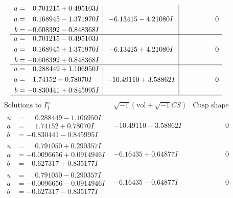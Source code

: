\documentclass[1p]{elsarticle_modified}
\theoremstyle{definition}
\newcommand{\I}{\sqrt{-1}}
\begin{document}
$$\begin{array}{c|c|c}
\begin{aligned}
u &= \phantom{-}0.701215 + 0.495103 I \\
a &= \phantom{-}0.168945 - 1.371970 I \\
b &= -0.608392 - 0.848368 I\end{aligned}
 & -6.13415 - 4.21080 I & \phantom{-0.000000 } 0 \\ \hline\begin{aligned}
u &= \phantom{-}0.701215 - 0.495103 I \\
a &= \phantom{-}0.168945 + 1.371970 I \\
b &= -0.608392 + 0.848368 I\end{aligned}
 & -6.13415 + 4.21080 I & \phantom{-0.000000 } 0 \\ \hline\begin{aligned}
u &= \phantom{-}0.288449 + 1.106950 I \\
a &= \phantom{-}1.74152 - 0.78070 I \\
b &= -0.830441 + 0.845995 I\end{aligned}
 & -10.49110 + 3.58862 I & \phantom{-0.000000 } 0\\
 \hline 
 \end{array}$$\newpage$$\begin{array}{c|c|c}  
\text{Solutions to }I^u_{1}& \I (\text{vol} + \sqrt{-1}CS) & \text{Cusp shape}\\
 \hline 
\begin{aligned}
u &= \phantom{-}0.288449 - 1.106950 I \\
a &= \phantom{-}1.74152 + 0.78070 I \\
b &= -0.830441 - 0.845995 I\end{aligned}
 & -10.49110 - 3.58862 I & \phantom{-0.000000 } 0 \\ \hline\begin{aligned}
u &= \phantom{-}0.791050 + 0.290357 I \\
a &= -0.0096656 + 0.0914946 I \\
b &= -0.627317 + 0.835177 I\end{aligned}
 & -6.16435 + 0.64877 I & \phantom{-0.000000 } 0 \\ \hline\begin{aligned}
u &= \phantom{-}0.791050 - 0.290357 I \\
a &= -0.0096656 - 0.0914946 I \\
b &= -0.627317 - 0.835177 I\end{aligned}
 & -6.16435 - 0.64877 I & \phantom{-0.000000 } 0 \\ \hline\begin{aligned}

\end{aligned}
\end{array}$$
\end{document}

